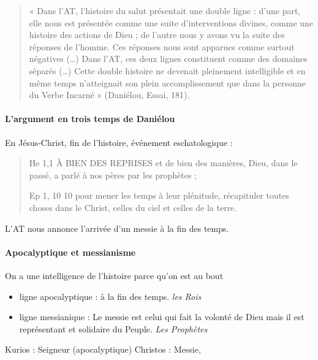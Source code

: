\begin{quote}
    « Dans l’AT, l’histoire du salut présentait une double ligne : d’une part, elle nous est présentée comme une suite d’interventions divines, comme une histoire des actions de Dieu ; de l’autre nous y avons vu la suite des réponses de l’homme. Ces réponses nous sont apparues comme surtout négatives (…) Dans l’AT, ces deux lignes constituent comme des domaines séparés (…) Cette double histoire ne devenait pleinement intelligible et en même temps n’atteignait son plein accomplissement que dans la personne du Verbe Incarné » (Daniélou, Essai, 181). 
\end{quote}

\paragraph{L’argument en trois temps de Daniélou } 

En Jésus-Christ, fin de l'histoire, événement eschatologique : 
    \begin{quote}
        He 1,1 À BIEN DES REPRISES et de bien des manières, Dieu, dans le passé, a parlé à nos pères par les prophètes ;
        
        
        Ep 1, 10 10 pour mener les temps à leur plénitude, récapituler toutes choses dans le Christ, celles du ciel et celles de la terre.
    \end{quote}
L'AT nous annonce l'arrivée d'un messie à la fin des temps. 



\paragraph{Apocalyptique et messianisme } On a une intelligence de l'histoire parce qu'on est au bout
\begin{itemize}
 
    
    \item ligne apocalyptique : à la fin des temps. \textit{les Rois}
    \item ligne messianique :  Le messie est celui qui fait la volonté de Dieu mais il est représentant et solidaire du Peuple. \textit{Les Prophètes}
\end{itemize}


\begin{Def}
Kurios : Seigneur (apocalyptique) 
Christos : Messie, 

\end{Def}

